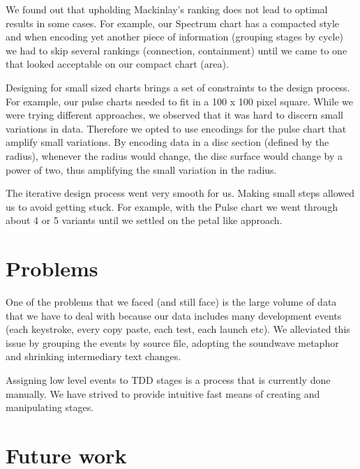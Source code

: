 \documentclass[journal]{vgtc}                %
\begin{document}
We found out that upholding Mackinlay's ranking does not lead to optimal results in some cases.
For example, our Spectrum chart has a compacted style and when encoding yet another piece of information (grouping stages by cycle) we had to skip several rankings (connection, containment) until we came to one that looked acceptable on our compact chart (area).

Designing for small sized charts brings a set of constraints to the design process.
For example, our pulse charts needed to fit in a 100 x 100 pixel square.
While we were trying different approaches, we observed that it was hard to discern small variations in data.
Therefore we opted to use encodings for the pulse chart that amplify small variations.
By encoding data in a disc section (defined by the radius), whenever the radius would change, the disc surface would change by a power of two, thus amplifying the small variation in the radius.

The iterative design process went very smooth for us.
Making small steps allowed us to avoid getting stuck.
For example, with the Pulse chart we went through about 4 or 5 variants until we settled on the petal like approach.


\section{Problems}

One of the problems that we faced (and still face) is the large volume of data that we have to deal with because our data includes many development events (each keystroke, every copy paste, each test, each launch etc).
We alleviated this issue by grouping the events by source file, adopting the soundwave metaphor and shrinking intermediary text changes.

Assigning low level events to TDD stages is a process that is currently done manually.
We have strived to provide intuitive fast means of creating and manipulating stages.

\section{Future work}
\end{document}
